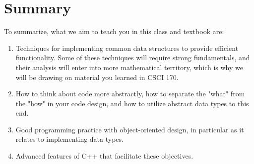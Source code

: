 \section{Summary}

To summarize, what we aim to teach you in this class and textbook are:

\begin{enumerate}
\item Techniques for implementing common data structures to provide efficient functionality.
Some of these techniques will require strong fundamentals, and their analysis will enter into more mathematical territory, which is why we will be drawing on material you learned in CSCI 170.
\item How to think about code more abstractly, how to separate the "what" from the "how" in your code design, and how to utilize abstract data types to this end.
\item Good programming practice with object-oriented design, in particular as it relates to implementing data types.
\item Advanced features of C++ that facilitate these objectives.
\end{enumerate}
